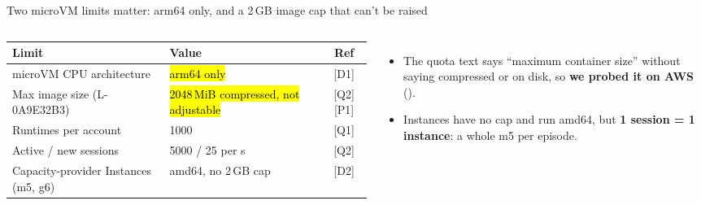 \begin{frame}{Two microVM limits matter: arm64 only, and a 2\,GB image cap that can't be raised}
\begin{columns}[T]
\scriptsize
\begin{tabularx}{\linewidth}{@{}Xlc@{}}
\toprule
\textbf{Limit} & \textbf{Value} & \textbf{Ref}\\
\midrule
microVM CPU architecture & \hl{arm64 only} & [D1]\\
Max image size (L-0A9E32B3) & \hl{2048\,MiB compressed, not adjustable} & [Q2][P1]\\
Runtimes per account & 1000 & [Q1]\\
Active / new sessions & 5000 / 25 per s & [Q2]\\
Capacity-provider Instances (m5, g6) & amd64, no 2\,GB cap & [D2]\\
\bottomrule
\end{tabularx}
\begin{itemize}\footnotesize\setlength{\itemsep}{1.5mm}
\item The quota text says ``maximum container size'' without saying compressed or on disk, so \textbf{we probed it on AWS} ().
\item Instances have no cap and run amd64, but \textbf{1 session = 1 instance}: a whole m5 per episode.
\end{itemize}
\end{columns}
\end{frame}


